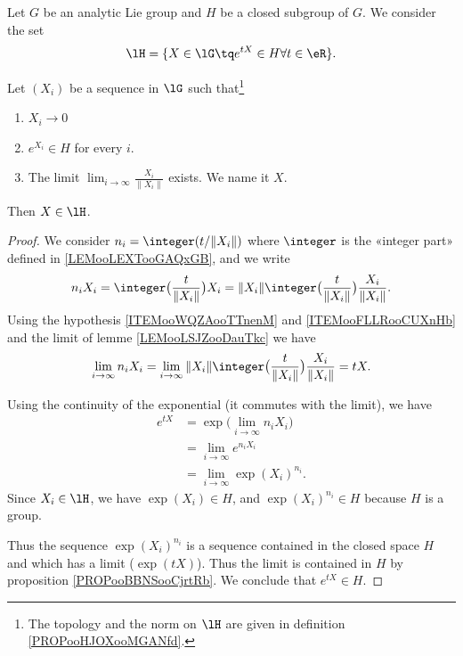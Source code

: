 \begin{lemma}     \label{LEMooFDIIooCkSJpY}
	Let \( G\) be an analytic Lie group and \( H\) be a closed subgroup of \( G\). We consider the set
	\begin{equation}
		\lH=\{ X\in \lG\tq  e^{tX}\in H\forall t\in \eR \}.
	\end{equation}

	Let \( (X_i)\) be a sequence in \( \lG\) such that\footnote{The topology and the norm on \( \lH\) are given in definition \ref{PROPooHJOXooMGANfd}.}
	\begin{enumerate}
		\item       \label{ITEMooWQZAooTTnenM}
		      \( X_i\to 0\)
		\item
		      \(  e^{X_i}\in H\) for every \( i\).
		\item       \label{ITEMooFLLRooCUXnHb}
		      The limit \( \lim_{i\to \infty} \frac{ X_i }{ \| X_i \| }\) exists. We name it \( X\).
	\end{enumerate}
	Then \( X\in \lH\).
\end{lemma}

\begin{proof}
	We consider \( n_i=\integer(t/\| X_i \|)\) where \( \integer\) is the «integer part» defined in \ref{LEMooLEXTooGAQxGB}, and we write
	\begin{equation}
		n_iX_i=\integer\big( \frac{ t }{ \| X_i \| } \big)X_i=\| X_i \|\integer\big( \frac{ t }{ \| X_i \| } \big)\frac{ X_i }{ \| X_i \| }.
	\end{equation}
	Using the hypothesis \ref{ITEMooWQZAooTTnenM} and \ref{ITEMooFLLRooCUXnHb} and the limit of lemme \ref{LEMooLSJZooDauTkc} we have
	\begin{equation}
		\lim_{i\to \infty} n_iX_i=\lim_{i\to \infty} \| X_i \|\integer\big( \frac{ t }{ \| X_i \| } \big)\frac{ X_i }{ \| X_i \| }=tX.
	\end{equation}

	Using the continuity of the exponential (it commutes with the limit), we have
	\begin{subequations}
		\begin{align}
			e^{tX} & =\exp\big( \lim_{i\to \infty} n_iX_i \big) \\
			       & =\lim_{i\to \infty}  e^{n_iX_i}            \\
			       & =\lim_{i\to \infty} \exp(X_i)^{n_i}.
		\end{align}
	\end{subequations}
	Since \( X_i\in \lH\), we have \( \exp(X_i)\in H\), and \( \exp(X_i)^{n_i}\in H\) because \( H\) is a group.

	Thus the sequence \( \exp(X_i)^{n_i}\) is a sequence contained in the closed space \( H\) and which has a limit (\( \exp(tX)\)). Thus the limit is contained in \( H\) by proposition \ref{PROPooBBNSooCjrtRb}. We conclude that \(  e^{tX}\in H\).
\end{proof}



